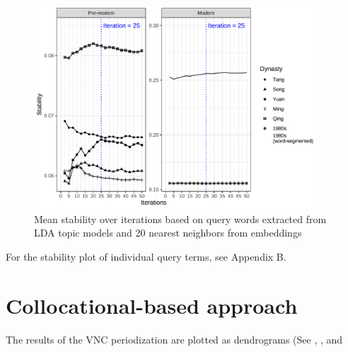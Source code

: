 \begin{figure}[H]
  \centering
  \includegraphics[width=0.95\textwidth,keepaspectratio]{figures_new/bootstrap_for_stability/stability.pdf}
  \caption{Mean stability over iterations based on query words extracted from LDA topic models and 20 nearest neighbors from  embeddings}
\end{figure}

For the stability plot of individual query terms, see Appendix B.

\section{Collocational-based approach}
The results of the VNC periodization are plotted as dendrograms (See , , and %

